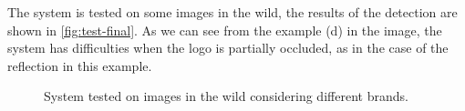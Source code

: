 The system is tested on some images in the wild, the results of the detection are shown in \autoref{fig:test-final}. As we can see from the example (d) in the image, the system has difficulties when the logo is partially occluded, as in the case of the reflection in this example.

\begin{figure}[H]
	\centering
    \qquad
    \caption{System tested on images in the wild considering different brands.}
	\label{fig:test-final}
\end{figure}


